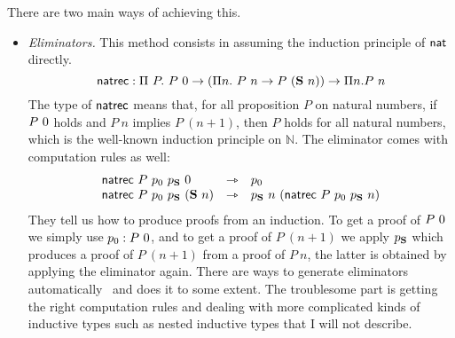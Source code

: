 There are two main ways of achieving this.
\begin{itemize}
  \item \emph{Eliminators.} This method consists in assuming the induction
  principle of \(\mathsf{nat}\) directly.
  \[
    \mathsf{natrec} :
      \Pi\ P.\
        P\ 0 \to
        (\Pi n.\ P\ n \to P\ (\mathbf{S}\ n)) \to
        \Pi n. P\ n
  \]
  The type of \(\mathsf{natrec}\) means that, for all proposition \(P\) on natural
  numbers, if \(P\ 0\) holds and \(P\ n\) implies \(P\ (n + 1)\), then
  \(P\) holds for all natural numbers, which is the well-known induction
  principle on \(\mathbb{N}\).
  The eliminator comes with computation rules as well:
  \[
    \begin{array}{lcl}
      \mathsf{natrec}\ P\ p_0\ p_{\mathbf{S}}\ 0 &\rightarrowtriangle& p_0 \\
      \mathsf{natrec}\ P\ p_0\ p_{\mathbf{S}}\ (\mathbf{S}\ n) &\rightarrowtriangle&
      p_{\mathbf{S}}\ n\ (\mathsf{natrec}\ P\ p_0\ p_{\mathbf{S}}\ n) \\
    \end{array}
  \]
  They tell us how to produce proofs from an induction. To get a proof of
  \(P\ 0\) we simply use \(p_0 : P\ 0\), and to get a proof of
  \(P\ (n+1)\) we apply \(p_{\mathbf{S}}\) which produces a proof of \(P\ (n+1)\)
  from a proof of \(P\ n\), the latter is obtained by applying the eliminator
  again.
  There are ways to generate eliminators
  automatically~ and \Coq does it to some extent.
  The troublesome part is getting the right computation rules and dealing with
  more complicated kinds of inductive types such as nested inductive types
  that I will not describe.


\end{itemize}

